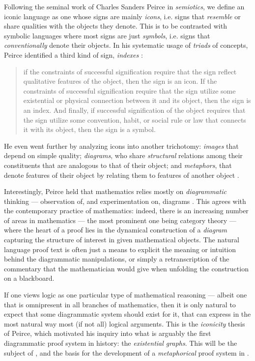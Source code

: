Following the seminal work of Charles Sanders Peirce in
\emph{semiotics}, we define an iconic language as one whose
signs are mainly \emph{icons}, i.e. signs that \emph{resemble} or share
qualities with the objects they denote. This is to be contrasted with symbolic
languages where most signs are just \emph{symbols}, i.e. signs that
\emph{conventionally} denote their objects. In his systematic usage of
\emph{triads} of concepts, Peirce identified a third kind of sign,
\emph{indexes} :
\begin{quote}
  if the constraints of successful signification require that the sign reflect
  qualitative features of the object, then the sign is an icon. If the
  constraints of successful signification require that the sign utilize some
  existential or physical connection between it and its object, then the sign is
  an index. And finally, if successful signification of the object requires that
  the sign utilize some convention, habit, or social rule or law that connects
  it with its object, then the sign is a symbol.
\end{quote}
He even went further by analyzing icons into another
trichotomy:
\emph{images} that depend on simple quality; \emph{diagrams}, who share
\emph{structural} relations among their constituents that are analogous to that
of their object; and \emph{metaphors}, that denote features of their object by
relating them to features of another object .

Interestingly, Peirce held that mathematics relies mostly on \emph{diagrammatic}
thinking --- observation of, and experimentation on, diagrams
. This agrees with the contemporary
practice of mathematics: indeed, there is an increasing number of areas in
mathematics --- the most prominent one being category theory --- where the heart
of a proof lies in the dynamical construction of a \emph{diagram} capturing the
structure of interest in given mathematical objects. The natural language proof
text is often just a means to explicit the meaning or intuition behind the
diagrammatic manipulations, or simply a retranscription of the commentary that
the mathematician would give when unfolding the construction on a blackboard.

If one views logic as one particular type of mathematical reasoning --- albeit
one that is omnipresent in all branches of mathematics, then it is only natural
to expect that some diagrammatic system should exist for it, that can express in
the most natural way most (if not all) logical arguments. This is the
\emph{iconicity} thesis of Peirce, which motivated his inquiry into what is
arguably the first diagrammatic proof system in history: the \emph{existential
graphs}. This will be the subject of , and the basis for the
development of a \emph{metaphorical} proof system in .

